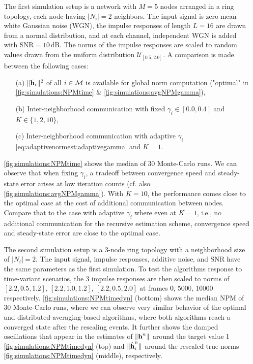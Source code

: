 \documentclass{article}
\begin{document}
The first simulation setup is a network with \(M=5\) nodes arranged in a ring topology, each node having \(|N_i|=2\) neighbors.
The input signal is zero-mean white Gaussian noise (WGN), the impulse responses of length \(L=16\) are drawn from a normal distribution, and at each channel, independent WGN is added with \(\text{SNR}=10\,\text{dB}\).
The norms of the impulse responses are scaled to random values drawn from the uniform distribution \(\mathcal{U}_{[0.5,2.0]}\).
A comparison is made between the following cases:
\begin{itemize}
    \itemsep-0.2em
    \item[(a)] \(\|\bar{\bm{\mathrm{h}}}_i\|^2\) of all \(i \in \mathcal{M}\) is available for global norm computation ("optimal" in \autoref{fig:simulations:NPMtime} \& \autoref{fig:simulations:avgNPMgamma}),
    \item[(b)] Inter-neighborhood communication with fixed \(\gamma_i \in [0.0, 0.4]\) and \(K \in \{1,2,10\}\),
    \item[(c)] Inter-neighborhood communication with adaptive \(\gamma_i\) \eqref{eq:adaptivenormest:adaptivegamma} and \(K=1\).
\end{itemize}
\autoref{fig:simulations:NPMtime} shows the median of 30 Monte-Carlo runs.
We can observe that when fixing \(\gamma_i\), a tradeoff between convergence speed and steady-state error arises at low iteration counts (cf. also \autoref{fig:simulations:avgNPMgamma}).
With \(K=10\), the performance comes close to the optimal case at the cost of additional communication between nodes.
Compare that to the case with adaptive \(\gamma_i\) where even at \(K=1\), i.e., no additional communication for the recursive estimation scheme, convergence speed and steady-state error are close to the optimal case.

The second simulation setup is a \(3\)-node ring topology with a neighborhood size of \(|N_i|=2\).
The input signal, impulse responses, additive noise, and SNR have the same parameters as the first simulation.
To test the algorithms response to time-variant scenarios, the 3 impulse responses are then scaled to norms of \([2.2, 0.5, 1.2],\, [2.2, 1.0, 1.2],\, [2.2, 0.5, 2.0]\) at frames \(0,\, 5000,\, 10000\) respectively.
\autoref{fig:simulations:NPMtimedyn} (bottom) shows the median NPM of 30 Monte-Carlo runs, where we can observe very similar behavior of the optimal and distributed-averaging-based algorithms, where both algorithms reach a converged state after the rescaling events.
It further shows the damped oscillations that appear in the estimates of \(\|\bm{\mathrm{h}}^n\|\) around the target value 1 \autoref{fig:simulations:NPMtimedyn} (top) and \(\|\hat{\bm{\mathrm{h}}}_i^n\|\) around the rescaled true norms \autoref{fig:simulations:NPMtimedyn} (middle), respectively.
\end{document}
